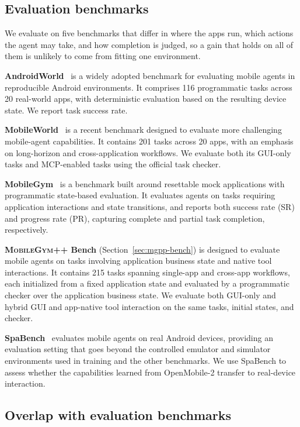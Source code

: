 \subsection{Evaluation benchmarks}
\label{app:eval-bench}

We evaluate on five benchmarks that differ in where the apps run, which actions the agent may take, and how completion is judged, so a gain that holds on all of them is unlikely to come from fitting one environment.

\textbf{AndroidWorld}~\citep{rawles2025androidworld} is a widely adopted benchmark for evaluating mobile agents in reproducible Android environments. It comprises 116 programmatic tasks across 20 real-world apps, with deterministic evaluation based on the resulting device state. We report task success rate.

\textbf{MobileWorld}~\citep{kong2026mobileworld} is a recent benchmark designed to evaluate more challenging mobile-agent capabilities. It contains 201 tasks across 20 apps, with an emphasis on long-horizon and cross-application workflows. We evaluate both its GUI-only tasks and MCP-enabled tasks using the official task checker.

\textbf{MobileGym}~\citep{wu2026mobilegym} is a benchmark built around resettable mock applications with programmatic state-based evaluation. It evaluates agents on tasks requiring application interactions and state transitions, and reports both success rate (SR) and progress rate (PR), capturing complete and partial task completion, respectively.

\textbf{\textsc{MobileGym++} Bench} (Section~\ref{sec:mgpp-bench}) is designed to evaluate mobile agents on tasks involving application business state and native tool interactions. It contains 215 tasks spanning single-app and cross-app workflows, each initialized from a fixed application state and evaluated by a programmatic checker over the application business state. We evaluate both GUI-only and hybrid GUI and app-native tool interaction on the same tasks, initial states, and checker.

\textbf{SpaBench}~\citep{chen2024spa} evaluates mobile agents on real Android devices, providing an evaluation setting that goes beyond the controlled emulator and simulator environments used in training and the other benchmarks. We use SpaBench to assess whether the capabilities learned from OpenMobile-2 transfer to real-device interaction.


\subsection{Overlap with evaluation benchmarks}
\label{app:leakage}


